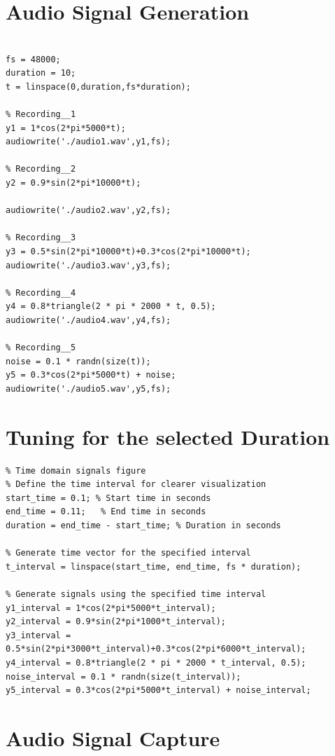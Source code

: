 \documentclass{report}
\begin{document}
\section{Audio Signal Generation}

\begin{lstlisting}

fs = 48000;
duration = 10;
t = linspace(0,duration,fs*duration);

% Recording__1
y1 = 1*cos(2*pi*5000*t);
audiowrite('./audio1.wav',y1,fs);

% Recording__2
y2 = 0.9*sin(2*pi*10000*t);

audiowrite('./audio2.wav',y2,fs);

% Recording__3 
y3 = 0.5*sin(2*pi*10000*t)+0.3*cos(2*pi*10000*t);
audiowrite('./audio3.wav',y3,fs);

% Recording__4
y4 = 0.8*triangle(2 * pi * 2000 * t, 0.5);
audiowrite('./audio4.wav',y4,fs);

% Recording__5
noise = 0.1 * randn(size(t));
y5 = 0.3*cos(2*pi*5000*t) + noise;
audiowrite('./audio5.wav',y5,fs);

\end{lstlisting}



\section{Tuning for the selected Duration}


\begin{lstlisting}
% Time domain signals figure
% Define the time interval for clearer visualization
start_time = 0.1; % Start time in seconds
end_time = 0.11;   % End time in seconds
duration = end_time - start_time; % Duration in seconds

% Generate time vector for the specified interval
t_interval = linspace(start_time, end_time, fs * duration);

% Generate signals using the specified time interval
y1_interval = 1*cos(2*pi*5000*t_interval);
y2_interval = 0.9*sin(2*pi*1000*t_interval);
y3_interval = 0.5*sin(2*pi*3000*t_interval)+0.3*cos(2*pi*6000*t_interval);
y4_interval = 0.8*triangle(2 * pi * 2000 * t_interval, 0.5);
noise_interval = 0.1 * randn(size(t_interval));
y5_interval = 0.3*cos(2*pi*5000*t_interval) + noise_interval;
\end{lstlisting}



\section{Audio Signal Capture}
\end{document}
